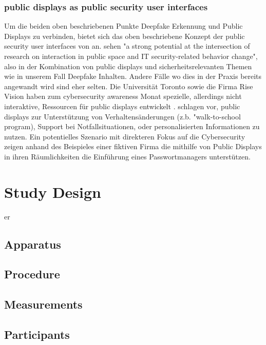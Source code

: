 \subsection{public displays as public security user interfaces}
Um die beiden oben beschriebenen Punkte Deepfake Erkennung und Public Displays zu verbinden, 
bietet sich das oben beschriebene Konzept der public security user interfaces von an. 
\textcite{murtezajPublicSecurityUser2025} sehen "a strong potential at the intersection of research on interaction in public space and IT security-related behavior change", 
also in der Kombination von public displays und sicherheitsrelevanten Themen wie in unserem Fall Deepfake Inhalten. 
Andere Fälle wo dies in der Praxis bereits angewandt wird sind eher selten. Die Universität Toronto sowie die Firma Rise Vision haben zum cybersecurity awareness Monat spezielle, 
allerdings nicht interaktive, Ressourcen für public displays entwickelt \cite{visionCyberSecurityAwareness,CyberSecurityAwareness}. 
\textcite{daviesOpenDisplayNetworks2012} schlagen vor, public displays zur Unterstützung von Verhaltensänderungen (z.b. "walk-to-school program), 
Support bei Notfallsituationen, oder personalisierten Informationen zu nutzen. 
Ein potentielles Szenario mit direkteren Fokus auf die Cybersecurity zeigen \textcite{murtezajPublicSecurityUser2025} anhand des Beispieles einer fiktiven Firma die mithilfe 
von Public Displays in ihren Räumlichkeiten die Einführung eines Passwortmanagers unterstützen. 
\chapter{Study Design}

\gls{er}

\section{Apparatus}

\section{Procedure}

\section{Measurements}

\section{Participants}

